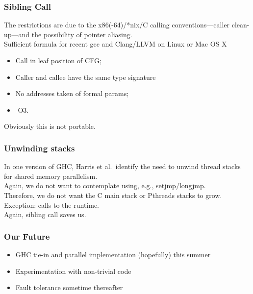 \documentclass{beamer}
\begin{document}
\begin{frame}
\frametitle{Sibling Call}
The restrictions are due to the x86(-64)/*nix/C calling
conventions---caller clean-up---and the possibility of pointer aliasing.
\\\vspace{0.1in}
Sufficient formula for recent gcc and Clang/LLVM on Linux or Mac OS X
\begin{itemize}
\item Call in leaf position of CFG;
\item Caller and callee have the same type signature
\item No addresses taken of formal params;
\item -O3.
\end{itemize}
Obviously this is not portable.
\end{frame}


\begin{frame}
\frametitle{Unwinding stacks}
In one version of GHC, Harris et al.\ identify the need to unwind thread stacks for shared
memory parallelism.
\\\vspace{0.1in}
Again, we do not want to contemplate using, e.g., setjmp/longjmp.
\\\vspace{0.1in}
Therefore, we do not want the C main stack or Pthreads stacks to grow.
\\\vspace{0.1in}
Exception:  calls to the runtime.
\\\vspace{0.1in}
Again, sibling call saves us.
\end{frame}


\begin{frame}
  \frametitle{Our Future}
  
  \begin{itemize}
  \item<1-> GHC tie-in and parallel implementation (hopefully) this summer
  \item<2-> Experimentation with non-trivial code
  \item<3-> Fault tolerance sometime thereafter
  \end{itemize}
   
\end{frame}
\end{document}
